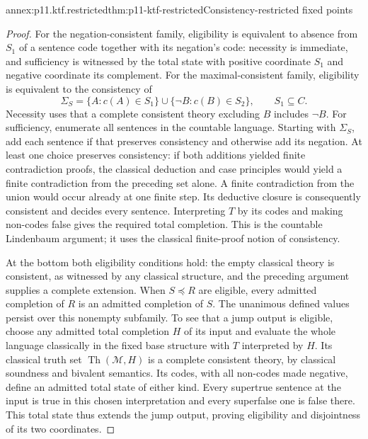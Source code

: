 \begin{annexitem}{annex:p11.ktf.restricted}{thm:p11-ktf-restricted}{Consistency-restricted fixed points}
\begin{proof}
For the negation-consistent family, eligibility is equivalent to
absence from \(S_1\) of a sentence code together with its negation's
code: necessity is immediate, and sufficiency is witnessed
by the total state with positive coordinate \(S_1\) and negative
coordinate its complement. For the maximal-consistent family,
eligibility is equivalent to the consistency of
\[
 \Sigma_S=\{A:c(A)\in S_1\}\cup
          \{\neg B:c(B)\in S_2\},\qquad S_1\subseteq C.
\]
Necessity uses that a complete consistent theory excluding \(B\)
includes \(\neg B\). For sufficiency, enumerate all sentences in
the countable language. Starting with \(\Sigma_S\), add each sentence
if that preserves consistency and otherwise add its negation. At least
one choice preserves consistency: if both additions yielded finite
contradiction proofs, the classical deduction and case principles would
yield a finite contradiction from the preceding set alone. A finite
contradiction from the union would occur already at one finite step.
Its deductive closure is consequently consistent and decides every
sentence. Interpreting \(T\) by its codes and making non-codes false
gives the required total completion. This is the countable Lindenbaum
argument; it uses the classical finite-proof notion of consistency.

At the bottom both eligibility conditions hold: the empty classical
theory is consistent, as witnessed by any classical structure, and the
preceding argument supplies a complete extension. When \(S\preceq R\)
are eligible, every admitted completion of \(R\) is an admitted
completion of \(S\). The unanimous defined values persist over this
nonempty subfamily. To see that a jump output is eligible, choose any
admitted total completion \(H\) of its input and evaluate the whole
language classically in the fixed base structure with \(T\) interpreted
by \(H\). Its classical truth set \(\operatorname{Th}(\mathcal M,H)\)
is a complete consistent theory, by classical soundness and bivalent
semantics. Its codes, with all non-codes made negative, define an admitted
total state of either kind. Every supertrue sentence at the input is
true in this chosen interpretation and every superfalse one is false
there. This total state thus extends the jump output, proving eligibility
and disjointness of its two coordinates.


\end{proof}
\end{annexitem}
